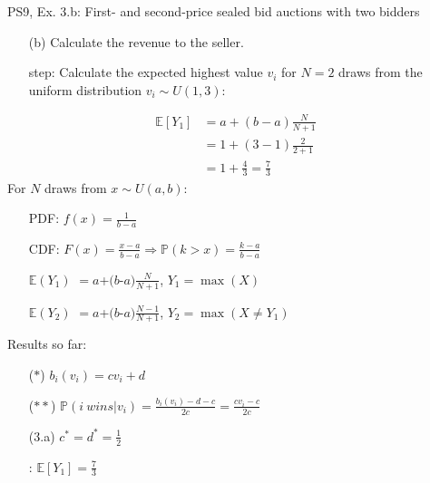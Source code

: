 \begin{frame}{PS9, Ex. 3.b: First- and second-price sealed bid auctions with two bidders}
    \begin{multicols}{2}
      \begin{itemize}
        \item[(b)] Calculate the revenue to the seller.
        \item[\nth{1} step:] Calculate the expected highest value $v_i$ for $N=2$ draws from the uniform distribution $v_i\sim U(1,3)$:
      \end{itemize}
      \vspace{-8pt}
      \begin{align*}
        \mathbb{E}[Y_1]&=a+(b-a)\frac{N}{N+1}\\
                       &=1+(3-1)\frac{2}{2+1}\\
                       &=1+\frac{4}{3}=\frac{7}{3}
      \end{align*}
      \vfill\null\columnbreak
      For $N$ draws from $x\sim U(a, b):$
      \vspace{-6pt}
      \begin{enumerate}
        \item[PDF:] $f(x)=\frac{1}{b-a}$
        \item[CDF:] $F(x)=\frac{x-a}{b-a}\Rightarrow\mathbb{P}(k>x)=\frac{k-a}{b-a}$
        \item[$\mathbb{E}(Y_1)$] $=a$+$(b$-$a)\frac{N}{N+1}$, $Y_1=\max(X)$
        \item[$\mathbb{E}(Y_2)$] $=a$+$(b$-$a)\frac{N-1}{N+1}$, $Y_2=\max(X\neq Y_1)$
      \end{enumerate}
      \vspace{-6pt}
      Results so far:
      \vspace{-6pt}
      \begin{itemize}
        \item[($*$)]  $b_i(v_i) = cv_i+d$
        \item[($**$)] $\mathbb{P}(i\ wins|v_i)=\frac{b_i(v_i)-d-c}{2c}=\frac{cv_i-c}{2c}$
        \item[(3.a)]    $c^*=d^*=\frac{1}{2}$
        \item[\nth{1}:] $\mathbb{E}[Y_1]=\frac{7}{3}$
      \end{itemize}
      \vfill\null
    \end{multicols}
\end{frame}
